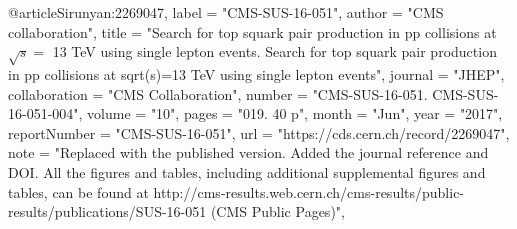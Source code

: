 @article{Sirunyan:2269047,
      label          = "CMS-SUS-16-051",
      author        = "{CMS collaboration}",
      title         = "{Search for top squark pair production in pp collisions at
                       $ \sqrt{s} = $ 13 TeV using single lepton events. Search
                       for top squark pair production in pp collisions at
                       sqrt(s)=13 TeV using single lepton events}",
      journal       = "JHEP",
      collaboration = "CMS Collaboration",
      number        = "CMS-SUS-16-051. CMS-SUS-16-051-004",
      volume        = "10",
      pages         = "019. 40 p",
      month         = "Jun",
      year          = "2017",
      reportNumber  = "CMS-SUS-16-051",
      url           = "https://cds.cern.ch/record/2269047",
      note          = "Replaced with the published version. Added the journal
                       reference and DOI. All the figures and tables, including
                       additional supplemental figures and tables, can be found at
                       http://cms-results.web.cern.ch/cms-results/public-results/publications/SUS-16-051
                       (CMS Public Pages)",
}

